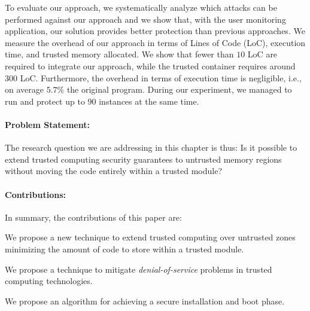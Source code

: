 To evaluate our approach, we systematically analyze which attacks can be 
performed against our approach and we show that, with the user monitoring 
application, our solution provides better protection than previous approaches. 
We measure the overhead of our approach in terms of Lines of Code (LoC), 
execution time, and trusted memory allocated. We 
show that fewer than $10$ LoC are required to 
integrate our approach, while the trusted container requires around $300$ LoC.
Furthermore, the overhead in terms of execution time is 
negligible, i.e., on average $5.7\%$ \wrt the original program.
During our experiment, we managed to run and protect up to 90 instances at the 
same time.

\vspace{-0.25cm}
\paragraph{\textbf{Problem Statement:}} 
The research question we are addressing in this chapter is thus: Is it possible 
to extend trusted computing security guarantees to untrusted memory regions 
without moving the code entirely within a trusted module?

\vspace{-0.25cm}
\paragraph{\textbf{Contributions:}}In summary, the contributions of this paper 
are:

\begin{enumerate*}[label=(\textbf{\alph*})]
	\item We propose a new technique to extend trusted computing over untrusted 
	zones minimizing the amount of code to store within a trusted module.
	\item We propose a technique to mitigate \emph{denial-of-service} problems 
	in trusted computing technologies.
	\item We propose an algorithm for achieving a secure installation and boot 
	phase.
\end{enumerate*}


